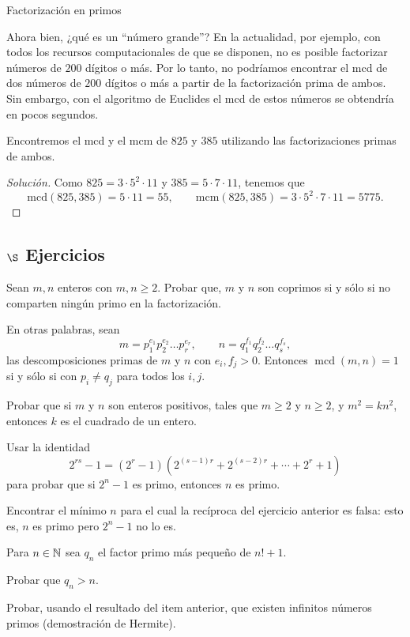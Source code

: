 \begin{section}{Factorización en primos}
\begin{observacion*}
 Ahora bien, ¿qué es un ``número grande''? En la actualidad, por ejemplo, con todos los recursos computacionales de que se disponen, no es posible factorizar números de $200$ dígitos o más. Por lo tanto, no podríamos encontrar el mcd  de dos números de $200$ dígitos o más a partir de la factorización prima de ambos. Sin embargo,  con el algoritmo de Euclides el mcd de estos números se obtendría en pocos segundos.     
\end{observacion*}


\begin{ejemplo*}
Encontremos el mcd y el mcm  de $825$ y $385$ utilizando las factorizaciones primas de ambos.
\begin{proof}[Solución]
    Como $825 =  3\cdot 5^2\cdot 11$ y $385 = 5\cdot 7\cdot 11$, tenemos que
    $$
    \text{mcd}(825,385) = 5\cdot 11 = 55, \qquad \text{mcm}(825,385) = 3\cdot 5^2\cdot 7\cdot 11 = 5775.
    $$
\end{proof}
\end{ejemplo*}



\subsection*{$\S$ Ejercicios}

\begin{enumex}
    \item Sean $m,n$ enteros con $m,n\ge 2$. Probar que,  $m$ y  $n$ son coprimos si y sólo si no comparten ningún primo en la factorización. 
    
    En otras palabras, sean  
    $$
    m=p_1^{e_1}p_2^{e_2}\ldots p_r^{e_r},\qquad
    n=q_1^{f_1}q_2^{f_2}\ldots q_s^{f_s},
    $$ 
    las descomposiciones primas de $m$ y $n$ con $e_i,f_j > 0$. Entonces  $\operatorname{mcd}(m,n) =1$ si y sólo si con $p_i \not= q_j$ para todos los $i,j$.  
    
\item Probar que si $m$ y $n$ son enteros positivos, tales que $m\ge 2$ y $n \ge 2$, y
$m^2 = kn^2$, entonces $k$ es el cuadrado de un entero.

\item Usar la identidad
$$
2^{rs} -1 = (2^r-1) (2^{(s-1)r}+2^{(s-2)r}+\cdots +2^r+1)
$$
para probar que si $2^n-1$ es primo, entonces $n$ es primo.

\item Encontrar el mínimo $n$ para el cual la recíproca del ejercicio anterior
es falsa: esto es, $n$ es primo pero $2^n-1$ no lo es.

\item Para $n \in {\mathbb N}$ sea $q_n$ el factor primo más pequeño de $n! + 1$. 
    \begin{enumex}
        \item Probar que $q_n >n$.
        \item Probar, usando el resultado del item anterior, que existen infinitos números primos (demostración de Hermite). 
    \end{enumex}
\end{enumex}

\end{section}    
    

